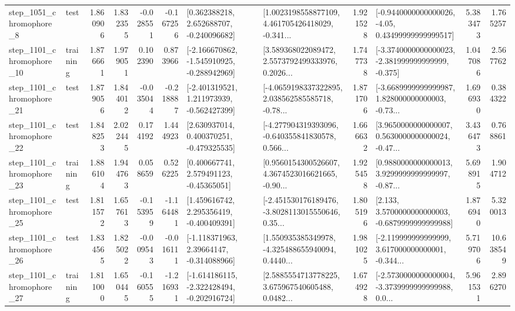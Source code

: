 \begin{tabular}{llrrrrllrlrr}
  step\_1051\_chromophore\_8 &      test &      1.860906 &    1.832355 &     -0.028551 & -0.167256 &    [0.362388218, 2.652688707, -0.240096682] &  [1.0023198558877109, 4.461705426418029, -0.341... &       1.921528 &  [-0.9440000000000026, -4.05, 0.43499999999999517] &            5.383473 &          1.765257 \\
 step\_1101\_chromophore\_10 &  training &      1.876661 &    1.979051 &      0.102390 &  0.873966 &  [-2.166670862, -1.545910925, -0.288942969] &  [3.589368022089472, 2.5573792499333976, 0.2026... &       1.747738 &  [-3.3740000000000023, -2.381999999999999, -0.375] &            1.047086 &          2.567762 \\
 step\_1101\_chromophore\_21 &      test &      1.879056 &    1.844012 &     -0.035044 & -0.218887 &   [-2.401319521, 1.211973939, -0.562427399] &  [-4.0659198337322895, 2.038562585585718, -0.78... &       1.871706 &  [-3.6689999999999987, 1.828000000000003, -0.73... &            1.696930 &          0.384322 \\
 step\_1101\_chromophore\_22 &      test &      1.848253 &    2.022445 &      0.174192 &  1.444923 &    [2.630937014, 0.400370251, -0.479325535] &  [-4.277904319393096, -0.640355841830578, 0.566... &       1.666632 &  [3.9650000000000007, 0.5630000000000024, -0.47... &            3.436473 &          0.768861 \\
 step\_1101\_chromophore\_23 &  training &      1.886104 &    1.944763 &      0.058659 &  0.526225 &     [0.400667741, 2.579491123, -0.45365051] &  [0.9560154300526607, 4.3674523016621665, -0.90... &       1.925458 &  [0.9880000000000013, 3.9299999999999997, -0.87... &            5.698915 &          1.904712 \\
 step\_1101\_chromophore\_25 &      test &      1.811572 &    1.657613 &     -0.153959 & -1.164481 &    [1.459616742, 2.295356419, -0.400409391] &  [-2.451530176189476, -3.8028113015550646, 0.35... &       1.805196 &   [2.133, 3.5700000000000003, -0.6879999999999988] &            1.876940 &          5.320013 \\
 step\_1101\_chromophore\_26 &      test &      1.834565 &    1.825022 &     -0.009543 & -0.016111 &    [-1.118371963, 2.39664147, -0.314088966] &  [1.550935385349978, -4.325488655940094, 0.4440... &       1.981025 &  [-2.119999999999999, 3.617000000000001, -0.344... &            5.719706 &         10.638549 \\
 step\_1101\_chromophore\_27 &  training &      1.811000 &    1.650445 &     -0.160555 & -1.216931 &  [-1.614186115, -2.322428494, -0.202916724] &  [2.5885554713778225, 3.675967540605488, 0.0482... &       1.674928 &  [-2.5730000000000004, -3.3739999999999988, 0.0... &            5.961531 &          2.896270 \\

\end{tabular}

